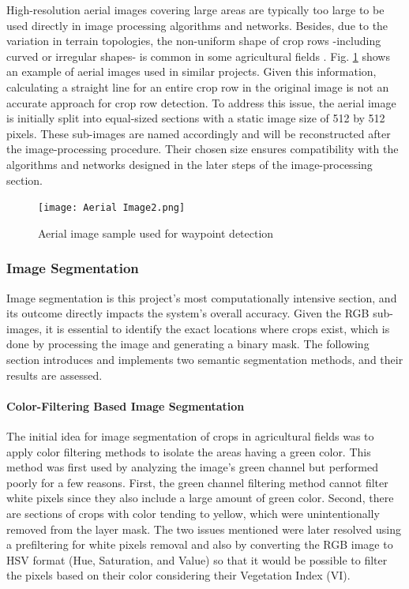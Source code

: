 \documentclass[conference]{IEEEtran}
\begin{document}
	High-resolution aerial images covering large areas are typically too large to be used directly in image processing algorithms and networks.
	Besides, due to the variation in terrain topologies, the non-uniform shape of crop rows -including curved or irregular shapes- is common in some agricultural fields
	\cite{b2, b3, b14}.
	Fig. \ref{fig_Aerial} shows an example of aerial images used in similar projects.
	Given this information, calculating a straight line for an entire crop row in the original image is not an accurate approach for crop row detection.
	To address this issue, the aerial image is initially split into equal-sized sections with a static image size of 512 by 512 pixels. These sub-images are named accordingly and will be reconstructed after the image-processing procedure. Their chosen size ensures compatibility with the algorithms and networks designed in the later steps of the image-processing section.
	
	
	\begin{figure}[t]
		\centering
		\texttt{[image: Aerial Image2.png]}
		\caption{Aerial image sample used for waypoint detection
			\cite{b5}}
		\label{fig_Aerial}
	\end{figure}
	
	\subsubsection{Image Segmentation}\label{Image Segmentation}\leavevmode
	
	Image segmentation is this project's most computationally intensive section, and its outcome directly impacts the system's overall accuracy. Given the RGB sub-images, it is essential to identify the exact locations where crops exist, which is done by processing the image and generating a binary mask. The following section introduces and implements two semantic segmentation methods, and their results are assessed.
	
	\paragraph{Color-Filtering Based Image Segmentation}\leavevmode
	
	The initial idea for image segmentation of crops in agricultural fields was to apply color filtering methods to isolate the areas having a green color. This method was first used by analyzing the image's green channel but performed poorly for a few reasons. First, the green channel filtering method cannot filter white pixels since they also include a large amount of green color. Second, there are sections of crops with color tending to yellow, which were unintentionally removed from the layer mask. The two issues mentioned were later resolved using a prefiltering for white pixels removal and also by converting the RGB image to HSV format (Hue, Saturation, and Value) so that it would be possible to filter the pixels based on their color considering their Vegetation Index (VI).
	
\end{document}
